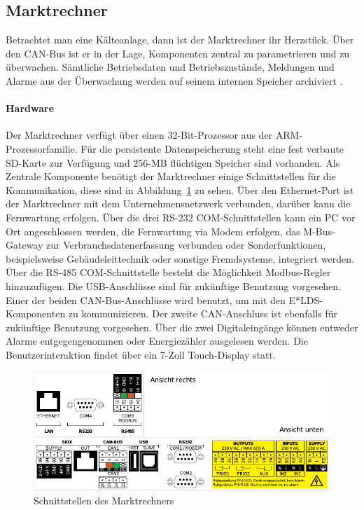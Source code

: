 \documentclass[11pt,a4paper]{report}
\begin{document}
\subsection{Marktrechner} \label{sec:marktrechner} 
Betrachtet man eine Kälteanlage, dann ist der Marktrechner ihr Herzstück. Über den CAN-Bus ist er in der Lage, Komponenten zentral zu parametrieren und zu überwachen. Sämtliche Betriebsdaten und Betriebszustände, Meldungen und Alarme aus der Überwachung werden auf seinem internen Speicher archiviert \cite{elds}.

\paragraph{Hardware} Der Marktrechner verfügt über einen 32-Bit-Prozessor aus der ARM-Prozessorfamilie. Für die persistente Datenspeicherung steht eine fest verbaute SD-Karte zur Verfügung und 256-MB flüchtigen Speicher sind vorhanden. Als Zentrale Komponente benötigt der Marktrechner einige Schnittstellen für die Kommunikation, diese sind in Abbildung~\ref{fig:marktrechner_interfaces} zu sehen. Über den Ethernet-Port ist der Marktrechner mit dem Unternehmensnetzwerk verbunden, darüber kann die Fernwartung erfolgen. Über die drei RS-232 COM-Schnittstellen kann ein PC vor Ort angeschlossen werden, die Fernwartung via Modem erfolgen, das M-Bus-Gateway zur Verbrauchsdatenerfassung verbunden oder Sonderfunktionen, beispielsweise Gebäudeleittechnik oder sonstige Fremdsysteme, integriert werden. Über die RS-485 COM-Schnittstelle besteht die Möglichkeit Modbus-Regler hinzuzufügen. Die USB-Anschlüsse sind für zukünftige Benutzung vorgesehen. Einer der beiden CAN-Bus-Anschlüsse wird benutzt, um mit den E*LDS-Komponenten zu kommunizieren. Der zweite CAN-Anschluss ist ebenfalls für zukünftige Benutzung vorgesehen. Über die zwei Digitaleingänge können entweder Alarme entgegengenommen oder Energiezähler ausgelesen werden. Die Benutzerinteraktion findet über ein 7-Zoll Touch-Display statt.

\begin{figure}[htbp]
\centering
\includegraphics[scale=1.1]{images/CI4000_Hardware_Sticker.pdf}
\caption{Schnittstellen des Marktrechners}
\label{fig:marktrechner_interfaces}
\end{figure}
\end{document}
